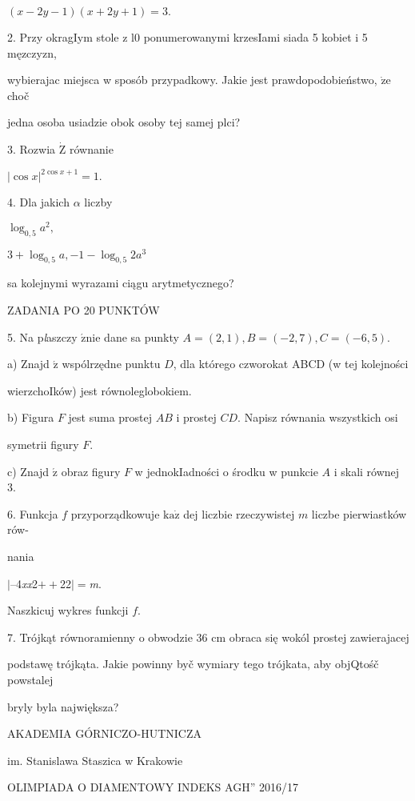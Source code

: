 \documentclass[a4paper,12pt]{article}
\begin{document}
$(x-2y-1)(x+2y+1)=3.$

2. Przy okragIym stole z l0 ponumerowanymi krzesIami siada 5 kobiet i 5 męzczyzn,

wybierajac miejsca w sposób przypadkowy. Jakie jest prawdopodobieństwo, $\dot{\mathrm{z}}\mathrm{e}$ choč

jedna osoba usiadzie obok osoby tej samej plci?

3. Rozwia $\dot{\mathrm{Z}}$ równanie

$|\cos x|^{2\cos x+1}=1.$

4. Dla jakich $\alpha$ liczby

$\log_{0,5}a^{2},$

$3+\log_{0,5}a, -1-\log_{0,5}2a^{3}$

sa kolejnymi wyrazami ciągu arytmetycznego?

ZADANIA PO 20 PUNKTÓW

5. Na p{\it l}aszczy $\acute{\mathrm{z}}\mathrm{n}\mathrm{i}\mathrm{e}$ dane sa punkty $A=(2,1), B=(-2,7), C=(-6,5).$

a) Znajd $\acute{\mathrm{z}}$ wspólrzędne punktu $D$, dla którego czworokat ABCD (w tej kolejności

wierzchoIków) jest równoleglobokiem.

b) Figura $F$ jest suma prostej $AB$ i prostej $CD$. Napisz równania wszystkich osi

symetrii figury $F.$

c) Znajd $\acute{\mathrm{z}}$ obraz figury $F$ w jednokIadności o środku w punkcie $A$ i skali równej 3.

6. Funkcja $f$ przyporządkowuje $\mathrm{k}\mathrm{a}\dot{\mathrm{z}}$ dej liczbie rzeczywistej $m$ liczbe pierwiastków rów-

nania

$|$--4{\it xx}2$++$22$|=${\it m}.

Naszkicuj wykres funkcji $f.$

7. Trójkąt równoramienny o obwodzie 36 cm obraca się wokól prostej zawierajacej

podstawę trójkąta. Jakie powinny byč wymiary tego trójkata, aby objQtośč powstalej

bryly byla największa?






AKADEMIA GÓRNICZO-HUTNICZA

im. Stanislawa Staszica w Krakowie

OLIMPIADA O DIAMENTOWY INDEKS AGH'' 2016/17
\end{document}
